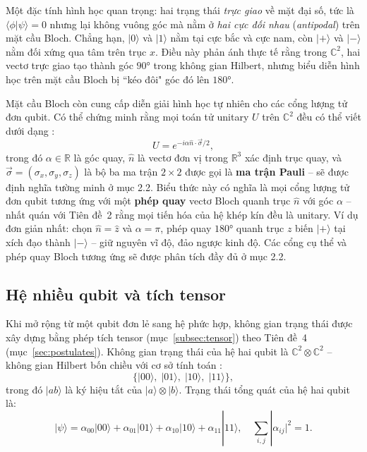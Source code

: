 \begin{remark}
Một đặc tính hình học quan trọng: hai trạng thái \emph{trực giao} về mặt đại số, tức là $\langle\phi|\psi\rangle = 0$ nhưng lại không vuông góc mà nằm ở \emph{hai cực
đối nhau} (\textit{antipodal}) trên mặt cầu Bloch. Chẳng hạn, $|0\rangle$ và
$|1\rangle$ nằm tại cực bắc và cực nam, còn $|+\rangle$ và $|-\rangle$ nằm đối
xứng qua tâm trên trục $x$. Điều này phản ánh thực tế rằng trong $\mathbb{C}^2$,
hai vectơ trực giao tạo thành góc $90°$ trong không gian Hilbert, nhưng biểu diễn
hình học trên mặt cầu Bloch bị ``kéo đôi" góc đó lên $180°$.
\end{remark}

Mặt cầu Bloch còn cung cấp diễn giải hình học tự nhiên cho các cổng lượng tử
đơn qubit. Có thể chứng minh rằng mọi toán tử unitary $U$ trên $\mathbb{C}^2$
đều có thể viết dưới dạng \cite{ref5}:
$$U = e^{-i\alpha\hat{n}\cdot\vec{\sigma}/2},$$
trong đó $\alpha \in \mathbb{R}$ là góc quay, $\hat{n}$ là vectơ đơn vị trong
$\mathbb{R}^3$ xác định trục quay, và $\vec{\sigma} = (\sigma_x, \sigma_y,
\sigma_z)$ là bộ ba ma trận $2\times 2$ được gọi là \textbf{ma trận Pauli} --
sẽ được định nghĩa tường minh ở mục 2.2. Biểu thức này có nghĩa là
mọi cổng lượng tử đơn qubit tương ứng với một \textbf{phép quay} vectơ Bloch
quanh trục $\hat{n}$ với góc $\alpha$ -- nhất quán với Tiên đề~2 rằng mọi tiến
hóa của hệ khép kín đều là unitary. Ví dụ đơn giản nhất: chọn $\hat{n} =
\hat{z}$ và $\alpha = \pi$, phép quay $180°$ quanh trục $z$ biến $|{+}\rangle$
tại xích đạo thành $|{-}\rangle$ -- giữ nguyên vĩ độ, đảo ngược kinh độ. Các
cổng cụ thể và phép quay Bloch tương ứng sẽ được phân tích đầy đủ ở mục 2.2.

\subsection*{Hệ nhiều qubit và tích tensor}

Khi mở rộng từ một qubit đơn lẻ sang hệ phức hợp, không gian trạng thái được
xây dựng bằng phép tích tensor (mục~\ref{subsec:tensor}) theo Tiên đề~4
(mục~\ref{sec:postulates}). Không gian trạng thái của hệ hai qubit là
$\mathbb{C}^2 \otimes \mathbb{C}^2$ -- không gian Hilbert bốn chiều với cơ sở
tính toán \cite{ref5}:
$$\{|00\rangle,\; |01\rangle,\; |10\rangle,\; |11\rangle\},$$
trong đó $|ab\rangle$ là ký hiệu tắt của $|a\rangle \otimes |b\rangle$.
Trạng thái tổng quát của hệ hai qubit là:
\begin{equation}
    |\psi\rangle = \alpha_{00}|00\rangle + \alpha_{01}|01\rangle
                + \alpha_{10}|10\rangle + \alpha_{11}|11\rangle,
    \quad \sum_{i,j}|\alpha_{ij}|^2 = 1.
    \label{eq:two-qubit}
\end{equation}

